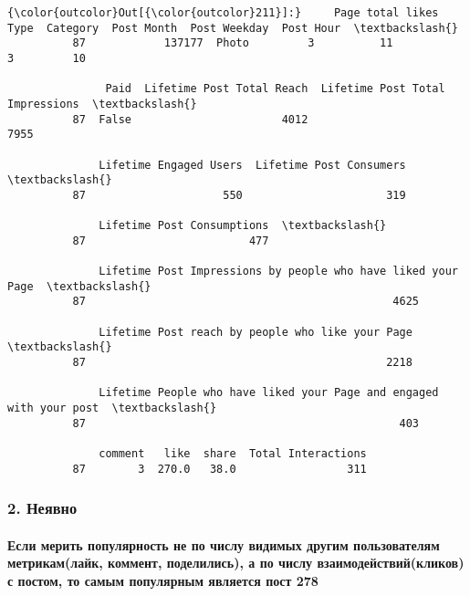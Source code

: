 \documentclass[11pt]{article}
\begin{document}
\begin{Verbatim}[commandchars=\\\{\}]
{\color{outcolor}Out[{\color{outcolor}211}]:}     Page total likes   Type  Category  Post Month  Post Weekday  Post Hour  \textbackslash{}
          87            137177  Photo         3          11             3         10   
          
               Paid  Lifetime Post Total Reach  Lifetime Post Total Impressions  \textbackslash{}
          87  False                       4012                             7955   
          
              Lifetime Engaged Users  Lifetime Post Consumers  \textbackslash{}
          87                     550                      319   
          
              Lifetime Post Consumptions  \textbackslash{}
          87                         477   
          
              Lifetime Post Impressions by people who have liked your Page  \textbackslash{}
          87                                               4625              
          
              Lifetime Post reach by people who like your Page  \textbackslash{}
          87                                              2218   
          
              Lifetime People who have liked your Page and engaged with your post  \textbackslash{}
          87                                                403                     
          
              comment   like  share  Total Interactions  
          87        3  270.0   38.0                 311  
\end{Verbatim}
            
    \subsubsection{2. Неявно}\label{ux43dux435ux44fux432ux43dux43e}

\paragraph{Если мерить популярность не по числу видимых другим
пользователям метрикам(лайк, коммент, поделились), а по числу
взаимодействий(кликов) с постом, то самым популярным является пост
278}\label{ux435ux441ux43bux438-ux43cux435ux440ux438ux442ux44c-ux43fux43eux43fux443ux43bux44fux440ux43dux43eux441ux442ux44c-ux43dux435-ux43fux43e-ux447ux438ux441ux43bux443-ux432ux438ux434ux438ux43cux44bux445-ux434ux440ux443ux433ux438ux43c-ux43fux43eux43bux44cux437ux43eux432ux430ux442ux435ux43bux44fux43c-ux43cux435ux442ux440ux438ux43aux430ux43cux43bux430ux439ux43a-ux43aux43eux43cux43cux435ux43dux442-ux43fux43eux434ux435ux43bux438ux43bux438ux441ux44c-ux430-ux43fux43e-ux447ux438ux441ux43bux443-ux432ux437ux430ux438ux43cux43eux434ux435ux439ux441ux442ux432ux438ux439ux43aux43bux438ux43aux43eux432-ux441-ux43fux43eux441ux442ux43eux43c-ux442ux43e-ux441ux430ux43cux44bux43c-ux43fux43eux43fux443ux43bux44fux440ux43dux44bux43c-ux44fux432ux43bux44fux435ux442ux441ux44f-ux43fux43eux441ux442-278}
\end{document}
